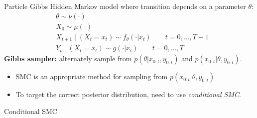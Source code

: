 \documentclass[aspectratio=169]{beamer}
\theoremstyle{definition}
\begin{document}
\begin{frame}{Particle Gibbs}
Hidden Markov model where transition depends on a parameter $\theta$:
\begin{align*}
& \theta \sim \nu(\cdot) \\
& X_0 \sim \mu(\cdot) \\
& X_{t+1} \mid (X_t = x_t) \sim f_{\theta}(\cdot | x_t)  \qquad t=0,\dots,T-1 \\
& Y_t \mid (X_t = x_t) \sim g(\cdot | x_t) \qquad t=0,\dots,T
\end{align*}
\textbf{Gibbs sampler:} alternately sample from $p(\theta | x_{0:t}, y_{0:t})$ and $p(x_{0:t} | \theta, y_{0:t})$.\\[7pt]
\begin{itemize}
\item SMC is an appropriate method for sampling from $p(x_{0:t} | \theta, y_{0:t})$
\item To target the correct posterior distribution, need to use \emph{conditional SMC}.
\end{itemize}
\end{frame}

\begin{frame}{Conditional SMC}

\end{frame}
\end{document}
